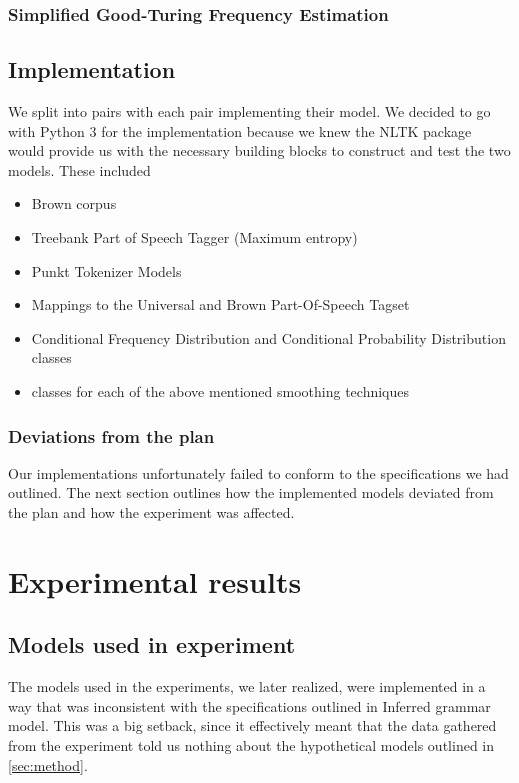 \documentclass[a4paper,12pt]{article}
\begin{document}
\subsubsection{Simplified Good-Turing Frequency Estimation}


\subsection{Implementation}
\label{sec:impl}

We split into pairs with each pair implementing their model. We decided to go with Python 3 for the implementation because we knew the NLTK package would provide us with the necessary building blocks to construct and test the two models. These included
\begin{itemize}
\item Brown corpus
\item Treebank Part of Speech Tagger (Maximum entropy)
\item Punkt Tokenizer Models
\item Mappings to the Universal and Brown Part-Of-Speech Tagset
\item Conditional Frequency Distribution and Conditional Probability Distribution classes
\item classes for each of the above mentioned smoothing techniques
\end{itemize}

\subsubsection{Deviations from the plan}
Our implementations unfortunately failed to conform to the specifications we had outlined. The next section outlines how the implemented models deviated from the plan and how the experiment was affected.


\section{Experimental results}
\label{sec:exps}

\subsection{Models used in experiment}
The models used in the experiments, we later realized, were implemented in a way that was inconsistent with the specifications outlined in {Inferred grammar model}. This was a big setback, since it effectively meant that the data gathered from the experiment told us nothing about the hypothetical models outlined in \ref{sec:method}.
\end{document}
